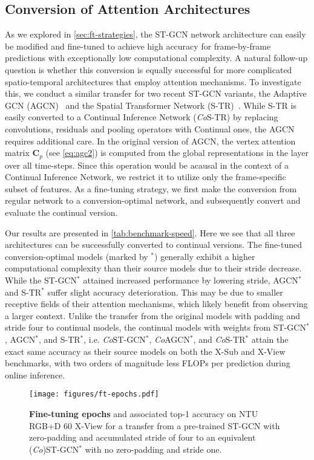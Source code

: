 \documentclass[journal]{IEEEtran}
\theoremstyle{definition}
\begin{document}
\subsection{Conversion of Attention Architectures}
As we explored in \cref{sec:ft-strategies}, the ST-GCN network architecture can easily be modified and fine-tuned to achieve high accuracy for frame-by-frame predictions with exceptionally low computational complexity.
A natural follow-up question is whether this conversion is equally successful for more complicated spatio-temporal architectures that employ attention mechanisms.
To investigate this, we conduct a similar transfer for two recent ST-GCN variants,
the Adaptive GCN (AGCN)~\cite{shi2019two} and the Spatial Transformer Network (S-TR)~\cite{plizzari2021skeleton}.
While S-TR is easily converted to a Continual Inference Network (\textit{Co}S-TR) by replacing convolutions, residuals and pooling operators with Continual ones, the AGCN requires additional care.
In the original version of AGCN, the vertex attention matrix $\mathbf{C}_p$ (see \cref{eq:agc2}) is computed from the global representations in the layer over all time-steps. 
Since this operation would be acausal in the context of a Continual Inference Network, we restrict it to utilize only the frame-specific subset of features. 
As a fine-tuning strategy, we first make the conversion from regular network to a conversion-optimal network, and subsequently convert and evaluate the continual version.

Our results are presented in \cref{tab:benchmark-speed}.
Here we see that all three architectures can be successfully converted to continual versions. 
The fine-tuned conversion-optimal models (marked by $^*$) generally exhibit a higher computational complexity than their source models due to their stride decrease. While the ST-GCN$^*$ attained increased performance by lowering stride, AGCN$^*$ and S-TR$^*$ suffer slight accuracy deterioration. This may be due to smaller receptive fields of their attention mechanisms, which likely benefit from observing a larger context.
Unlike the transfer from the original models with padding and stride four to continual models, the continual models with weights from ST-GCN$^*$, AGCN$^*$, and S-TR$^*$, i.e. \textit{Co}ST-GCN$^*$, \textit{Co}AGCN$^*$, and \textit{Co}S-TR$^*$ attain the exact same accuracy as their source models on both the X-Sub and X-View benchmarks, with two orders of magnitude less FLOPs per prediction during online inference.

\begin{figure}
    \centering
    \texttt{[image: figures/ft-epochs.pdf]}
    \caption{\textbf{Fine-tuning epochs} and associated top-1 accuracy on NTU RGB+D 60 X-View for a transfer from a pre-trained ST-GCN with zero-padding and accumulated stride of four to an equivalent (\textit{Co})ST-GCN$^*$ with no zero-padding and stride one. }
    \label{fig:tune-num-epochs}
\end{figure}
\end{document}
